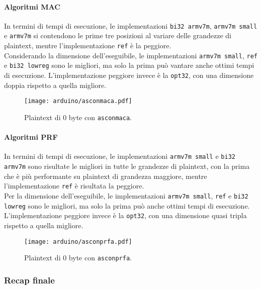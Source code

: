 \paragraph{Algoritmi MAC}

In termini di tempi di esecuzione, le implementazioni \texttt{bi32 armv7m}, \texttt{armv7m small} e \texttt{armv7m} si contendono le prime tre posizioni al variare delle grandezze di plaintext, mentre l'implementazione \texttt{ref} è la peggiore. \\

\noindent Considerando la dimensione dell'eseguibile, le implementazioni \texttt{armv7m small}, \texttt{ref} e \texttt{bi32 lowreg} sono le migliori, ma solo la prima può vantare anche ottimi tempi di esecuzione. L'implementazione peggiore invece è la \texttt{opt32}, con una dimensione doppia rispetto a quella migliore.

\begin{figure}[H]
    \centering
    \texttt{[image: arduino/asconmaca.pdf]}
    \caption{Plaintext di 0 byte con \texttt{asconmaca}.}
\end{figure}

\paragraph{Algoritmi PRF}

In termini di tempi di esecuzione, le implementazioni \texttt{armv7m small} e \texttt{bi32 armv7m} sono risultate le migliori in tutte le grandezze di plaintext, con la prima che è più performante su plaintext di grandezza maggiore, mentre l'implementazione \texttt{ref} è risultata la peggiore. \\

\noindent Per la dimensione dell'eseguibile, le implementazioni \texttt{armv7m small}, \texttt{ref} e \texttt{bi32 lowreg} sono le migliori, ma solo la prima può  anche ottimi tempi di esecuzione. L'implementazione peggiore invece è la \texttt{opt32}, con una dimensione quasi tripla rispetto a quella migliore.

\begin{figure}[H]
    \centering
    \texttt{[image: arduino/asconprfa.pdf]}
    \caption{Plaintext di 0 byte con \texttt{asconprfa}.}
\end{figure}

\subsubsection{Recap finale}


